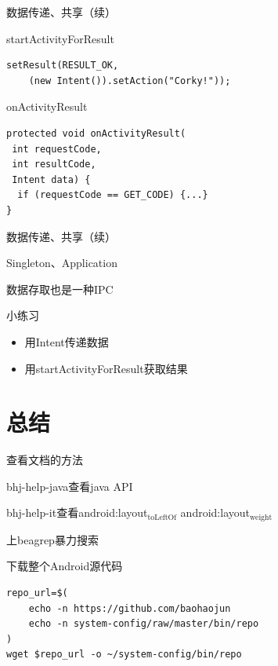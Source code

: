 \documentclass[presentation,dvipdfmx,CJKbookmarks]{beamer}
\begin{document}
\begin{CJK*}{UTF8}{simsun}
\begin{frame}[fragile,label={sec:org736affb}]{数据传递、共享（续）}
\begin{block}{startActivityForResult}
\begin{verbatim}
setResult(RESULT_OK,
    (new Intent()).setAction("Corky!"));
\end{verbatim}
\end{block}
\begin{block}{onActivityResult}
\begin{verbatim}
protected void onActivityResult(
 int requestCode,
 int resultCode,
 Intent data) {
  if (requestCode == GET_CODE) {...}
}
\end{verbatim}
\end{block}
\end{frame}
\begin{frame}[label={sec:org9ac3205}]{数据传递、共享（续）}
\begin{block}{Singleton、Application}
\end{block}
\begin{block}{数据存取也是一种\thinspace IPC}
\end{block}
\end{frame}

\begin{frame}[label={sec:org3119791}]{小练习}
\begin{itemize}
\item 用\thinspace Intent\thinspace 传递数据
\item 用\thinspace startActivityForResult\thinspace 获取结果
\end{itemize}
\end{frame}

\section{总结}
\label{sec:orgff57843}
\begin{frame}[label={sec:org751453e}]{查看文档的方法}
\begin{block}{bhj-help-java\thinspace 查看\thinspace java API}
\end{block}
\begin{block}{bhj-help-it\thinspace 查看\thinspace android:layout\(_{\text{toLeftOf}}\) android:layout\(_{\text{weight}}\)}
\end{block}
\begin{block}{上\thinspace beagrep\thinspace 暴力搜索}
\end{block}
\end{frame}
\begin{frame}[fragile,label={sec:org1da964e}]{下载整个\thinspace Android\thinspace 源代码}
 \begin{verbatim}
repo_url=$(
    echo -n https://github.com/baohaojun
    echo -n system-config/raw/master/bin/repo
)
wget $repo_url -o ~/system-config/bin/repo


\end{verbatim}
\end{frame}
\end{CJK*}
\end{document}
